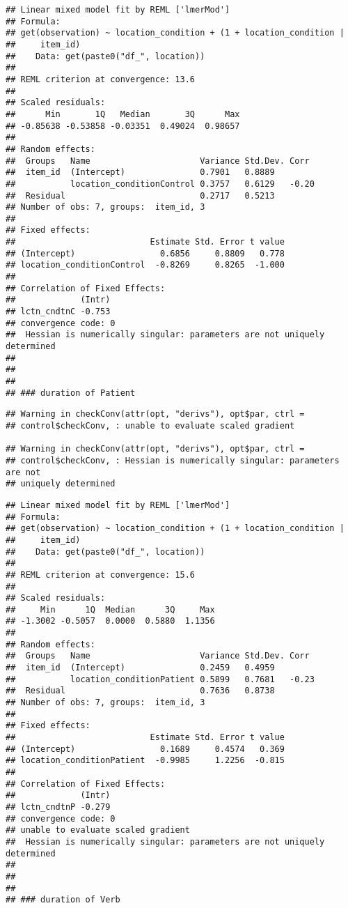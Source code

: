 \documentclass[]{article}
\begin{document}
\begin{verbatim}
## Linear mixed model fit by REML ['lmerMod']
## Formula: 
## get(observation) ~ location_condition + (1 + location_condition |  
##     item_id)
##    Data: get(paste0("df_", location))
## 
## REML criterion at convergence: 13.6
## 
## Scaled residuals: 
##      Min       1Q   Median       3Q      Max 
## -0.85638 -0.53858 -0.03351  0.49024  0.98657 
## 
## Random effects:
##  Groups   Name                      Variance Std.Dev. Corr 
##  item_id  (Intercept)               0.7901   0.8889        
##           location_conditionControl 0.3757   0.6129   -0.20
##  Residual                           0.2717   0.5213        
## Number of obs: 7, groups:  item_id, 3
## 
## Fixed effects:
##                           Estimate Std. Error t value
## (Intercept)                 0.6856     0.8809   0.778
## location_conditionControl  -0.8269     0.8265  -1.000
## 
## Correlation of Fixed Effects:
##             (Intr)
## lctn_cndtnC -0.753
## convergence code: 0
##  Hessian is numerically singular: parameters are not uniquely determined
## 
##   
##   
## ### duration of Patient
\end{verbatim}

\begin{verbatim}
## Warning in checkConv(attr(opt, "derivs"), opt$par, ctrl =
## control$checkConv, : unable to evaluate scaled gradient

## Warning in checkConv(attr(opt, "derivs"), opt$par, ctrl =
## control$checkConv, : Hessian is numerically singular: parameters are not
## uniquely determined
\end{verbatim}

\begin{verbatim}
## Linear mixed model fit by REML ['lmerMod']
## Formula: 
## get(observation) ~ location_condition + (1 + location_condition |  
##     item_id)
##    Data: get(paste0("df_", location))
## 
## REML criterion at convergence: 15.6
## 
## Scaled residuals: 
##     Min      1Q  Median      3Q     Max 
## -1.3002 -0.5057  0.0000  0.5880  1.1356 
## 
## Random effects:
##  Groups   Name                      Variance Std.Dev. Corr 
##  item_id  (Intercept)               0.2459   0.4959        
##           location_conditionPatient 0.5899   0.7681   -0.23
##  Residual                           0.7636   0.8738        
## Number of obs: 7, groups:  item_id, 3
## 
## Fixed effects:
##                           Estimate Std. Error t value
## (Intercept)                 0.1689     0.4574   0.369
## location_conditionPatient  -0.9985     1.2256  -0.815
## 
## Correlation of Fixed Effects:
##             (Intr)
## lctn_cndtnP -0.279
## convergence code: 0
## unable to evaluate scaled gradient
##  Hessian is numerically singular: parameters are not uniquely determined
## 
##   
##   
## ### duration of Verb
\end{verbatim}
\end{document}
